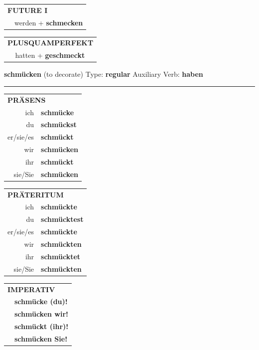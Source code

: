 \documentclass[10pt,a4paper]{revtex4-2}
\begin{document}
\begin{verbbox-dat}
\begin{tabular}{rl}
    \multicolumn{2}{l}{\textbf{FUTURE I} }\\
  &  werden + \textbf{schmecken}\\
 
  \end{tabular}
\hfill
   \begin{tabular}{rl}
      \multicolumn{2}{l}{\textbf{PLUSQUAMPERFEKT}}\\
  &  hatten + \textbf{geschmeckt}\\
  \end{tabular}
  
  \vspace{-5pt}


\end{verbbox-dat}

\begin{verbbox}
{\Large \bf schmücken} (to decorate) \hfill Type: \textbf{regular} \hfill Auxiliary Verb: \textbf{haben}

\vspace{5pt}
\hrule
\vspace{5pt}

\begin{tabular}{rl}
\multicolumn{2}{l}{\textbf{PRÄSENS}}\\
ich & \textbf{schmücke}\\
du & \textbf{schmückst}\\
er/sie/es & \textbf{schmückt}\\
wir & \textbf{schmücken}\\
ihr & \textbf{schmückt}\\
sie/Sie & \textbf{schmücken}\\
\end{tabular}
\hfill
\begin{tabular}{rl}
\multicolumn{2}{l}{\textbf{PRÄTERITUM}}\\
ich & \textbf{schmückte}\\
du & \textbf{schmücktest}\\
er/sie/es & \textbf{schmückte}\\
wir & \textbf{schmückten}\\
ihr & \textbf{schmücktet}\\
sie/Sie & \textbf{schmückten}\\
\end{tabular}
\hfill
\begin{tabular}{rl}
\multicolumn{2}{l}{\textbf{IMPERATIV}}\\
& \textbf{schmücke (du)!}\\
& \textbf{schmücken wir!}\\
& \textbf{schmückt (ihr)!}\\
& \textbf{schmücken Sie!}\\
\end{tabular}


\end{verbbox}
\end{document}
